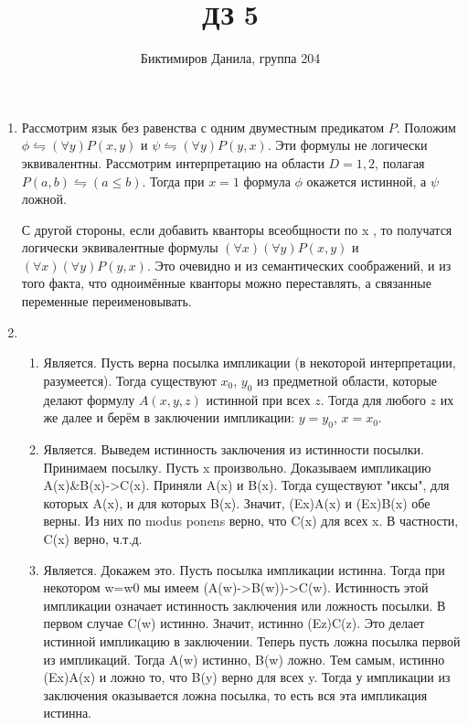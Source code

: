 \documentclass[11pt]{article}
\begin{document}
	
	\author{Биктимиров Данила, группа 204}
	\title{ДЗ 5}
	\date{}
	\maketitle
	
	\medskip
	
	\begin{enumerate}
		\item Рассмотрим язык без равенства с одним двуместным предикатом $P$. Положим $\phi \leftrightharpoons (\forall y)P(x,y)$ и $\psi \leftrightharpoons (\forall y)P(y,x)$. Эти формулы не логически эквивалентны. Рассмотрим интерпретацию на области $D={1,2}$, полагая $P(a,b)\leftrightharpoons(a\le b)$. Тогда при $x=1$ формула $\phi$ окажется истинной, а $\psi$ ложной.
		
		С другой стороны, если добавить кванторы всеобщности по x , то получатся логически эквивалентные формулы $(\forall x)(\forall y)P(x,y)$ и $(\forall x)(\forall y)P(y,x)$. Это очевидно и из семантических соображений, и из того факта, что одноимённые кванторы можно переставлять, а связанные переменные переименовывать.
		\item \begin{enumerate}
			\item Является. Пусть верна посылка импликации (в некоторой интерпретации, разумеется). Тогда существуют $x_0$, $y_0$ из предметной области, которые делают формулу $A(x,y,z)$ истинной при всех $z$. Тогда для любого $z$ их же далее и берём в заключении импликации: $y=y_0$, $x=x_0$.
			
			\item Является. Выведем истинность заключения из истинности посылки. Принимаем посылку. Пусть x произвольно. Доказываем импликацию A(x)&B(x)->C(x). Приняли A(x) и B(x). Тогда существуют "иксы", для которых A(x), и для которых B(x). Значит, (Ex)A(x) и (Ex)B(x) обе верны. Из них по modus ponens верно, что C(x) для всех x. В частности, C(x) верно, ч.т.д.
			
			\item Является. Докажем это. Пусть посылка импликации истинна. Тогда при некотором w=w0 мы имеем (A(w)->B(w))->C(w). Истинность этой импликации означает истинность заключения или ложность посылки. В первом случае C(w) истинно. Значит, истинно (Ez)C(z). Это делает истинной импликацию в заключении. Теперь пусть ложна посылка первой из импликаций. Тогда A(w) истинно, B(w) ложно. Тем самым, истинно (Ex)A(x) и ложно то, что B(y) верно для всех y. Тогда у импликации из заключения оказывается ложна посылка, то есть вся эта импликация истинна.
			

\end{enumerate}
\end{enumerate}
\end{document}
